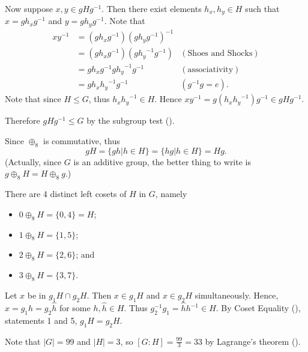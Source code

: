 \begin{questions}
    Now suppose $x, y \in gHg^{-1}$. Then there exist elements $h_x, h_y \in H$ such that $x = gh_xg^{-1}$ and $y = gh_yg^{-1}$. Note that
    \begin{align*}
        xy^{-1} &= (gh_xg^{-1})(gh_yg^{-1})^{-1}\\
        &= (gh_xg^{-1})(g{h_y}^{-1}g^{-1}) & (\text{Shoes and Shocks})\\
        &= gh_xg^{-1}g{h_y}^{-1}g^{-1} & (\text{associativity})\\
        &= gh_x{h_y}^{-1}g^{-1} & (g^{-1}g = e).
    \end{align*}
    Note that since $H \leq G$, thus $h_x{h_y}^{-1} \in H$. Hence $xy^{-1} = g(h_x{h_y}^{-1})g^{-1} \in gHg^{-1}$.

    Therefore $gHg^{-1} \leq G$ by the subgroup test ().

    \item \begin{partquestions}{\alph*}
        \item Since $\oplus_8$ is commutative, thus
        \[
            gH = \{gh \vert h \in H\} = \{hg \vert h \in H\} = Hg.
        \]
        (Actually, since $G$ is an additive group, the better thing to write is $g \oplus_8 H = H \oplus_8 g$.)
        
        \item There are 4 distinct left cosets of $H$ in $G$, namely
        \begin{itemize}
            \item $0 \oplus_8 H = \{0, 4\} = H$;
            \item $1 \oplus_8 H = \{1, 5\}$;
            \item $2 \oplus_8 H = \{2, 6\}$; and
            \item $3 \oplus_8 H = \{3, 7\}$.
        \end{itemize}
    \end{partquestions}

    \item Let $x$ be in $g_1H \cap g_2H$. Then $x \in g_1H$ and $x \in g_2H$ simultaneously. Hence, $x = g_1h = g_2\hat{h}$ for some $h, \hat{h} \in H$. Thus $g_2^{-1}g_1 = \hat{h}h^{-1} \in H$. By Coset Equality (), statements 1 and 5, $g_1H = g_2H$.

    \item Note that $|G| = 99$ and $|H| = 3$, so $[G:H] = \frac{99}{3} = 33$ by Lagrange's theorem ().


\end{questions}
